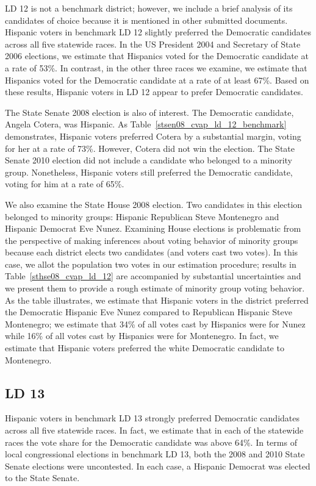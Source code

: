 \documentclass[12pt]{article}
\begin{document}
LD 12 is not a benchmark district; however, we include a brief
analysis of its candidates of choice because it is mentioned in other
submitted documents.  Hispanic voters in benchmark LD 12 slightly
preferred the Democratic candidates across all five statewide races.
In the US President 2004 and Secretary of State 2006 elections, we
estimate that Hispanics voted for the Democratic candidate at a rate
of 53\%.  In contrast, in the other three races we examine, we
estimate that Hispanics voted for the Democratic candidate at a rate
of at least 67\%. Based on these results, Hispanic voters in LD 12
appear to prefer Democratic candidates.

The State Senate 2008 election is also of interest. The Democratic
candidate, Angela Cotera, was Hispanic. As
Table~\ref{stsen08_cvap_ld_12_benchmark} demonstrates, Hispanic voters
preferred Cotera by a substantial margin, voting for her at a rate of
73\%. However, Cotera did not win the election. The State Senate 2010
election did not include a candidate who belonged to a minority group.
Nonetheless, Hispanic voters still preferred the Democratic candidate,
voting for him at a rate of 65\%.

We also examine the State House 2008 election. Two candidates in this
election belonged to minority groups: Hispanic Republican Steve
Montenegro and Hispanic Democrat Eve Nunez. Examining House elections
is problematic from the perspective of making inferences about voting
behavior of minority groups because each district elects two
candidates (and voters cast two votes). In this case, we allot the
population two votes in our estimation procedure; results in
Table~\ref{sthse08_cvap_ld_12} are accompanied by substantial
uncertainties and we present them to provide a rough estimate of
minority group voting behavior. As the table illustrates, we estimate
that Hispanic voters in the district preferred the Democratic Hispanic
Eve Nunez compared to Republican Hispanic Steve Montenegro; we
estimate that 34\% of all votes cast by Hispanics were for Nunez while
16\% of all votes cast by Hispanics were for Montenegro. In fact, we
estimate that Hispanic voters preferred the white Democratic candidate
to Montenegro.
 
\subsection{LD 13}
Hispanic voters in benchmark LD 13 strongly preferred Democratic
candidates across all five statewide races. In fact, we estimate that
in each of the statewide races the vote share for the Democratic
candidate was above 64\%. In terms of local congressional elections in
benchmark LD 13, both the 2008 and 2010 State Senate elections were
uncontested. In each case, a Hispanic Democrat was elected to the
State Senate.
\end{document}
